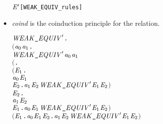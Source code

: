 \begin{itemize}
\begin{alltt}
        \HOLSymConst{\HOLTokenWeakEQ} \ensuremath{\HOLBoundVar{E}\sp{\prime}}\hfill{[WEAK_EQUIV_rules]}
\end{alltt}
\item \emph{coind} is the coinduction principle for the relation.
\begin{alltt}
\HOLTokenTurnstile{} \HOLSymConst{\HOLTokenForall{}}\ensuremath{\HOLBoundVar{WEAK\HOLTokenUnderscore{}EQUIV}\sp{\prime}}.
       \ensuremath{(}\HOLSymConst{\HOLTokenForall{}}\ensuremath{\HOLBoundVar{a}\sb{\mathrm{0}}} \ensuremath{\HOLBoundVar{a}\sb{\mathrm{1}}}.
            \ensuremath{\HOLBoundVar{WEAK\HOLTokenUnderscore{}EQUIV}\sp{\prime}} \ensuremath{\HOLBoundVar{a}\sb{\mathrm{0}}} \ensuremath{\HOLBoundVar{a}\sb{\mathrm{1}}} \HOLSymConst{\HOLTokenImp{}}
            \ensuremath{(}\HOLSymConst{\HOLTokenForall{}}.
                 \ensuremath{(}\HOLSymConst{\HOLTokenForall{}}\ensuremath{\HOLBoundVar{E}\sb{\mathrm{1}}}.
                      \ensuremath{\HOLBoundVar{a}\sb{\mathrm{0}}} \HOLTokenTransBegin{} \HOLTokenTransEnd \ensuremath{\HOLBoundVar{E}\sb{\mathrm{1}}} \HOLSymConst{\HOLTokenImp{}}
                      \HOLSymConst{\HOLTokenExists{}}\ensuremath{\HOLBoundVar{E}\sb{\mathrm{2}}}. \ensuremath{\HOLBoundVar{a}\sb{\mathrm{1}}} \HOLTokenWeakTransBegin{} \HOLTokenWeakTransEnd \ensuremath{\HOLBoundVar{E}\sb{\mathrm{2}}} \HOLSymConst{\HOLTokenConj{}} \ensuremath{\HOLBoundVar{WEAK\HOLTokenUnderscore{}EQUIV}\sp{\prime}} \ensuremath{\HOLBoundVar{E}\sb{\mathrm{1}}} \ensuremath{\HOLBoundVar{E}\sb{\mathrm{2}}}\ensuremath{)} \HOLSymConst{\HOLTokenConj{}}
                 \HOLSymConst{\HOLTokenForall{}}\ensuremath{\HOLBoundVar{E}\sb{\mathrm{2}}}.
                     \ensuremath{\HOLBoundVar{a}\sb{\mathrm{1}}} \HOLTokenTransBegin{} \HOLTokenTransEnd \ensuremath{\HOLBoundVar{E}\sb{\mathrm{2}}} \HOLSymConst{\HOLTokenImp{}}
                     \HOLSymConst{\HOLTokenExists{}}\ensuremath{\HOLBoundVar{E}\sb{\mathrm{1}}}. \ensuremath{\HOLBoundVar{a}\sb{\mathrm{0}}} \HOLTokenWeakTransBegin{} \HOLTokenWeakTransEnd \ensuremath{\HOLBoundVar{E}\sb{\mathrm{1}}} \HOLSymConst{\HOLTokenConj{}} \ensuremath{\HOLBoundVar{WEAK\HOLTokenUnderscore{}EQUIV}\sp{\prime}} \ensuremath{\HOLBoundVar{E}\sb{\mathrm{1}}} \ensuremath{\HOLBoundVar{E}\sb{\mathrm{2}}}\ensuremath{)} \HOLSymConst{\HOLTokenConj{}}
            \ensuremath{(}\HOLSymConst{\HOLTokenForall{}}\ensuremath{\HOLBoundVar{E}\sb{\mathrm{1}}}. \ensuremath{\HOLBoundVar{a}\sb{\mathrm{0}}} \HOLTokenTransBegin\HOLSymConst{\ensuremath{\tau}}\HOLTokenTransEnd \ensuremath{\HOLBoundVar{E}\sb{\mathrm{1}}} \HOLSymConst{\HOLTokenImp{}} \HOLSymConst{\HOLTokenExists{}}\ensuremath{\HOLBoundVar{E}\sb{\mathrm{2}}}. \ensuremath{\HOLBoundVar{a}\sb{\mathrm{1}}} \HOLSymConst{\HOLTokenEPS} \ensuremath{\HOLBoundVar{E}\sb{\mathrm{2}}} \HOLSymConst{\HOLTokenConj{}} \ensuremath{\HOLBoundVar{WEAK\HOLTokenUnderscore{}EQUIV}\sp{\prime}} \ensuremath{\HOLBoundVar{E}\sb{\mathrm{1}}} \ensuremath{\HOLBoundVar{E}\sb{\mathrm{2}}}\ensuremath{)} \HOLSymConst{\HOLTokenConj{}}

\end{alltt}
\end{itemize}

